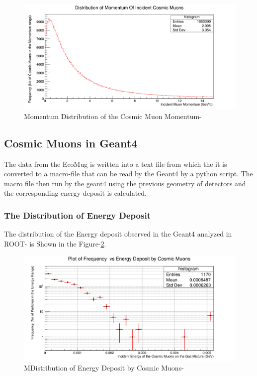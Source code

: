 \documentclass{article}
\begin{document}
\begin{multicols}{2}
\begin{figure}[H]
    \centering	
     \includegraphics[width=\columnwidth]{momentum.png}
     \caption{Momentum Distribution of the Cosmic Muon Momentum-\cite{ROOT}\cite{python}}
     \label{momentum}
\end{figure}





\subsection{Cosmic Muons in Geant4}

The data from the EcoMug is written into a text file from which the it is converted to
a macro-file that can be read by the Geant4 by a python script.
The macro file then run by the geant4 using the previous geometry of detectors
and the corresponding energy deposit is calculated.


\subsubsection{The Distribution of Energy Deposit}


The distribution of the Energy deposit observed in the Geant4
analyzed in ROOT-\cite{ROOT} is Shown in the Figure-\ref{cosmu}.

\begin{figure}[H]
    \centering	
     \includegraphics[width=\columnwidth]{cosmu.png}
     \caption{MDistribution of Energy Deposit by Cosmic Muons-\cite{ROOT}\cite{python}}
     \label{cosmu}
\end{figure}



\end{multicols}
\end{document}
